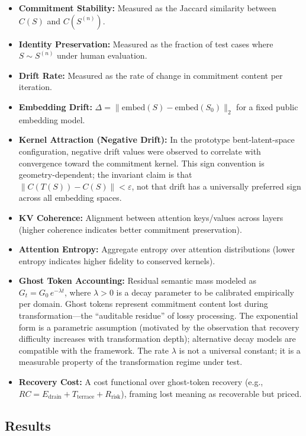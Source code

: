 \documentclass[11pt,a4paper]{article}
\begin{document}
\begin{itemize}
    \item \textbf{Commitment Stability:} Measured as the Jaccard similarity between $C(S)$ and $C(S^{(n)})$.
    \item \textbf{Identity Preservation:} Measured as the fraction of test cases where $S \sim S^{(n)}$ under human evaluation.
    \item \textbf{Drift Rate:} Measured as the rate of change in commitment content per iteration.
    \item \textbf{Embedding Drift:} $\Delta = \| \mathrm{embed}(S) - \mathrm{embed}(S_0) \|_2$ for a fixed public embedding model.
    \item \textbf{Kernel Attraction (Negative Drift):} In the prototype bent-latent-space configuration, negative drift values were observed to correlate with convergence toward the commitment kernel. This sign convention is geometry-dependent; the invariant claim is that $\| C(T(S)) - C(S) \| < \varepsilon$, not that drift has a universally preferred sign across all embedding spaces.
    \item \textbf{KV Coherence:} Alignment between attention keys/values across layers (higher coherence indicates better commitment preservation).
    \item \textbf{Attention Entropy:} Aggregate entropy over attention distributions (lower entropy indicates higher fidelity to conserved kernels).
    \item \textbf{Ghost Token Accounting:} Residual semantic mass modeled as $G_t = G_0 \, e^{-\lambda t}$, where $\lambda > 0$ is a decay parameter to be calibrated empirically per domain. Ghost tokens represent commitment content lost during transformation---the ``auditable residue'' of lossy processing. The exponential form is a parametric assumption (motivated by the observation that recovery difficulty increases with transformation depth); alternative decay models are compatible with the framework. The rate $\lambda$ is not a universal constant; it is a measurable property of the transformation regime under test.
    \item \textbf{Recovery Cost:} A cost functional over ghost-token recovery (e.g., $RC = E_{\text{drain}} + T_{\text{terrace}} + R_{\text{risk}}$), framing lost meaning as recoverable but priced.
\end{itemize}

\subsection{Results}
\end{document}
